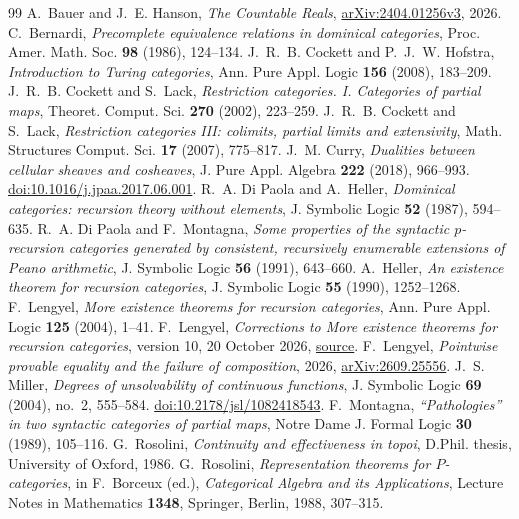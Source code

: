 \documentclass[11pt]{article}
\begin{document}
\begin{thebibliography}{99}
\small
{}
A.~Bauer and J.~E. Hanson, \emph{The Countable Reals},
\href{https://arxiv.org/abs/2404.01256v3}{arXiv:2404.01256v3}, 2026.
C.~Bernardi, \emph{Precomplete equivalence relations in dominical
categories}, Proc. Amer. Math. Soc. \textbf{98} (1986), 124--134.
J.~R.~B. Cockett and P.~J.~W. Hofstra,
\emph{Introduction to Turing categories},
Ann. Pure Appl. Logic \textbf{156} (2008), 183--209.
J.~R.~B. Cockett and S.~Lack, \emph{Restriction categories. I.
Categories of partial maps}, Theoret. Comput. Sci. \textbf{270}
(2002), 223--259.
J.~R.~B. Cockett and S.~Lack,
\emph{Restriction categories III: colimits, partial limits and extensivity},
Math. Structures Comput. Sci. \textbf{17} (2007), 775--817.
J.~M. Curry, \emph{Dualities between cellular sheaves and cosheaves},
J. Pure Appl. Algebra \textbf{222} (2018), 966--993.
\href{https://doi.org/10.1016/j.jpaa.2017.06.001}
{doi:10.1016/j.jpaa.2017.06.001}.
R.~A. Di Paola and A.~Heller, \emph{Dominical categories:
recursion theory without elements}, J. Symbolic Logic
\textbf{52} (1987), 594--635.
R.~A. Di Paola and F.~Montagna, \emph{Some properties of the syntactic
$p$-recursion categories generated by consistent, recursively enumerable
extensions of Peano arithmetic}, J. Symbolic Logic \textbf{56} (1991),
643--660.
A.~Heller, \emph{An existence theorem for recursion categories},
J. Symbolic Logic \textbf{55} (1990), 1252--1268.
F.~Lengyel, \emph{More existence theorems for recursion categories},
Ann. Pure Appl. Logic \textbf{125} (2004), 1--41.
F.~Lengyel, \emph{Corrections to More existence theorems for recursion
categories}, version 10, 20 October 2026,
\href{https://github.com/flengyel/errata/blob/5555e4fa1da7b8e3a0836dd1fbf1ca385cacd03b/lengyel2004/lengyel2004_repairs_v10.tex}{source}.
F.~Lengyel, \emph{Pointwise provable equality and the failure of
composition}, 2026,
\href{https://arxiv.org/abs/2609.25556}{arXiv:2609.25556}.
J.~S. Miller, \emph{Degrees of unsolvability of continuous functions},
J. Symbolic Logic \textbf{69} (2004), no.~2, 555--584.
\href{https://doi.org/10.2178/jsl/1082418543}{doi:10.2178/jsl/1082418543}.
F.~Montagna, \emph{``Pathologies'' in two syntactic categories of partial
maps}, Notre Dame J. Formal Logic \textbf{30} (1989), 105--116.
G.~Rosolini, \emph{Continuity and effectiveness in topoi}, D.Phil.
thesis, University of Oxford, 1986.
G.~Rosolini, \emph{Representation theorems for $P$-categories},
in F.~Borceux (ed.), \emph{Categorical Algebra and its Applications},
Lecture Notes in Mathematics \textbf{1348}, Springer, Berlin, 1988,
307--315.
\end{thebibliography}
\end{document}

